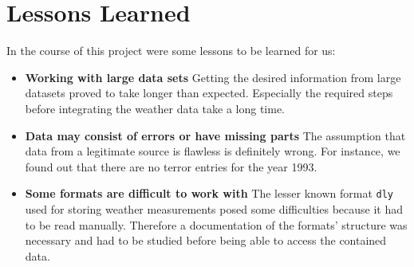 \section{Lessons Learned}

In the course of this project were some lessons to be learned for us:
\begin{itemize}
	\item \textbf{Working with large data sets} Getting the desired information from large datasets proved to take longer than expected. Especially the required steps before integrating the weather data take a long time.
	\item \textbf{Data may consist of errors or have missing parts} The assumption that data from a legitimate source is flawless is definitely wrong. For instance, we found out that there are no terror entries for the year 1993.
	\item \textbf{Some formats are difficult to work with} The lesser known format \texttt{dly} used for storing weather measurements posed some difficulties because it had to be read manually. Therefore a documentation of the formats' structure was necessary and had to be studied before being able to access the contained data.
\end{itemize}